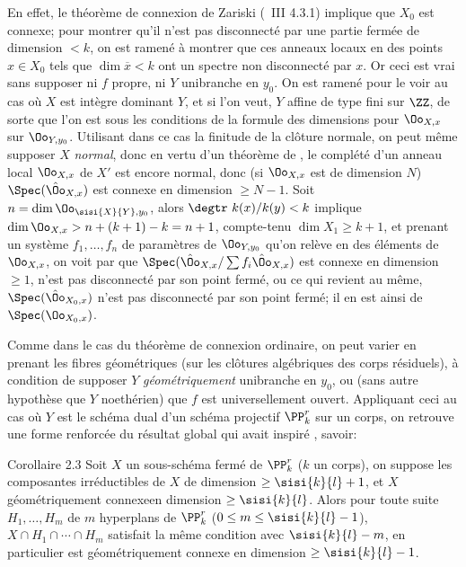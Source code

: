 En effet, le th\'eor\`eme de connexion de Zariski (\cf\ \EGA III 4.3.1) implique que $X_0$ est connexe; pour montrer qu'il n'est pas disconnect\'e par une partie ferm\'ee de dimension $<k$, on est ramen\'e \`a montrer que ces anneaux locaux en des points $x\in X_0$ tels que $\dim \overline{x}<k$ ont un spectre non disconnect\'e par $x$. Or ceci est vrai sans supposer ni $f$ propre, ni $Y$ unibranche en $y_0$. On est ramen\'e pour le voir au cas o\`u $X$ est int\`egre dominant $Y$, et si l'on veut, $Y$ affine de type fini sur $\ZZ$, de sorte que l'on est sous les conditions de la formule des dimensions pour $\Oo_{X, x}$ sur $\Oo_{Y, y_0}$. Utilisant dans ce cas la finitude de la cl\^{o}ture normale, on peut m\^eme supposer $X$ \emph{normal}, donc en vertu d'un th\'eor\`eme de , le compl\'et\'e d'un anneau local $\Oo_{X, x}$ de $X'$ est encore normal, donc (si $\Oo_{X, x}$ est de dimension $N$) $\Spec (\hat{\Oo}_{X, x})$ est connexe en dimension $\ge N-1$. Soit $n=\dim\Oo_{\sisi{X}{Y}, y_0}$, alors $\degtr~k(x)/k(y)<k$ implique $\dim \Oo_{X, x}>n+(k+1)-k=n+1$, compte-tenu  $\dim X_1\ge k+1$, et prenant un syst\`eme $f_1, \dotsc, f_n$ de param\`etres de $\Oo_{Y, y_0}$ qu'on rel\`eve en des \'el\'ements de $\Oo_{X, x}$, on voit par  que $\Spec (\hat{\Oo}_{X, x}/\sum f_i\hat{\Oo}_{X, x})$ est connexe en dimension $\ge 1$, \ie n'est pas disconnect\'e par son point ferm\'e, ou ce qui revient au m\^eme, $\Spec(\hat{\Oo}_{X_0, x})$ n'est pas disconnect\'e par son point ferm\'e; \afortiori il en est ainsi de $\Spec (\Oo_{X_0, x})$.

Comme dans le cas du th\'eor\`eme de connexion ordinaire, on peut varier  en prenant les fibres g\'eom\'etriques (sur les cl\^{o}tures alg\'ebriques des corps r\'esiduels), \`a condition de supposer $Y$ \emph{g\'eom\'etriquement} unibranche en $y_0$, ou (sans autre hypoth\`ese que $Y$ noeth\'erien) que $f$ est universellement ouvert. Appliquant ceci au cas o\`u $Y$ est le sch\'ema dual d'un sch\'ema projectif $\PP_k^r$ sur un corps, on retrouve une forme renforc\'ee du r\'esultat global qui avait inspir\'e , savoir:

\label{XIII.2.3}
\begin{enonce*}{Corollaire 2.3\ndemark}
Soit $X$ un sous-sch\'ema ferm\'e de $\PP^r_k$ ($k$ un corps), on suppose les composantes irr\'eductibles de $X$ de dimension $\ge \sisi{k}{l}+1$, et $X$ g\'eom\'etriquement connexe\pageoriginaled en dimension $\ge \sisi{k}{l}$. Alors pour toute suite $H_1, \dotsc, H_m$ de $m$ hyperplans de $\PP^r_k$ ($0\le m\le \sisi{k}{l}-1$), $X\cap H_1\cap \dotsb \cap H_m$ satisfait la m\^eme condition avec $\sisi{k}{l}-m$, en particulier est g\'eom\'etriquement connexe en dimension $\ge \sisi{k}{l}-1$.
\end{enonce*}

